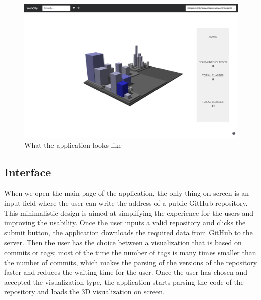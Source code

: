 \documentclass[]{usiinfbachelorproject}
\begin{document}
\begin{figure} [H]
\centering
\includegraphics[width=1\textwidth]{pictures/app.png}
\caption{What the application looks like}
\label{fig:app}
\end{figure}

\subsection{Interface} \label{Interface}

When we open the main page of the application, the only thing on screen is an input field where the user can write the address of a public GitHub repository. This minimalistic design is aimed at simplifying the experience for the users and improving the usability. Once the user inputs a valid repository and clicks the submit button, the application downloads the required data from GitHub to the server. Then the user has the choice between a visualization that is based on commits or tags; most of the time the number of tags is many times smaller than the number of commits, which makes the parsing of the versions of the repository faster and reduces the waiting time for the user. Once the user has chosen and accepted the visualization type, the application starts parsing the code of the repository and loads the 3D visualization on screen.

%
%
\end{document}

